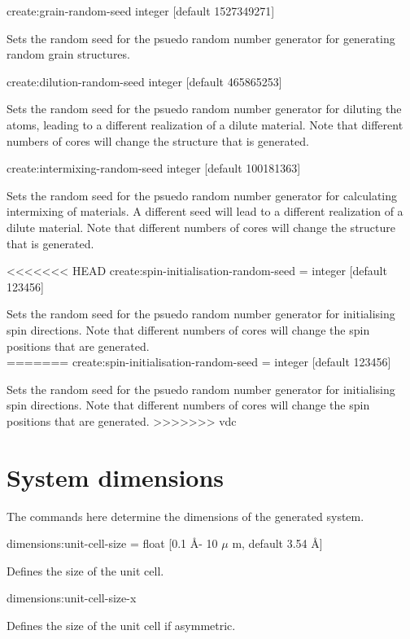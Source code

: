 {\zicf create:grain-random-seed integer [default 1527349271]} Sets the random seed for the psuedo random number generator for generating random grain structures.

{\zicf create:dilution-random-seed integer [default 465865253]} Sets the random seed for the psuedo random number generator for diluting the atoms, leading to a different realization of a dilute material. Note that different numbers of cores will change the structure that is generated.

{\zicf create:intermixing-random-seed integer [default 100181363]} Sets the random seed for the psuedo random number generator for calculating intermixing of materials. A different seed will lead to a different realization of a dilute material. Note that different numbers of cores will change the structure that is generated.

<<<<<<< HEAD
{\zicf create:spin-initialisation-random-seed = integer [default 123456]}
Sets the random seed for the psuedo random number generator for initialising
spin directions. Note that different numbers of cores will change the
spin positions that are generated.\\
=======
{\zicf create:spin-initialisation-random-seed = integer [default 123456]} Sets the random seed for the psuedo random number generator for initialising spin directions. Note that different numbers of cores will change the spin positions that are generated.
>>>>>>> vdc

\section*{System dimensions} The commands here determine the dimensions of the generated system.

{\zicf dimensions:unit-cell-size = float [0.1 \AA - 10 $\mu$ m, default 3.54 \AA]} Defines the size of the unit cell.

{\zicf dimensions:unit-cell-size-x} Defines the size of the unit cell if asymmetric.

